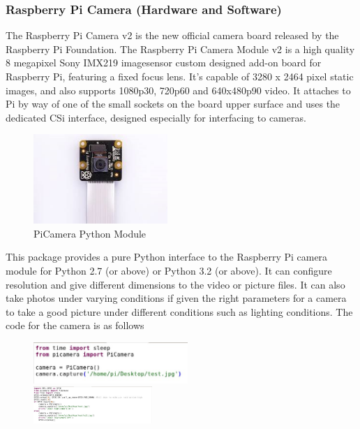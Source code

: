 \subsubsection{Raspberry Pi Camera (Hardware and Software)}
\par The Raspberry Pi Camera v2 is the new official camera board released by the Raspberry Pi Foundation. The Raspberry Pi Camera Module v2 is a high quality 8 megapixel Sony IMX219 imagesensor custom designed add-on board for Raspberry Pi, featuring a fixed focus lens. It's capable of 3280 x 2464 pixel static images, and also supports 1080p30, 720p60 and 640x480p90 video. It attaches to Pi by way of one of the small sockets on the board upper surface and uses the dedicated CSi interface, designed especially for interfacing to cameras.
\begin{figure}[h]
	\centering
	\includegraphics[width=2in]{picam.jpg}
	\caption{PiCamera Python Module}
\end{figure}
\par This package provides a pure Python interface to the Raspberry Pi camera module for Python 2.7 (or above) or Python 3.2 (or above). It can configure resolution and give different dimensions to the video or picture files. It can also take photos under varying conditions if given the right parameters for a camera to take a good picture under different conditions such as lighting conditions. 
The code for the camera is as follows
\begin{figure}[h]
	\includegraphics[width=2.3in]{camcode1.jpg}\\
	\includegraphics[width=0.4\textwidth]{camcode2.jpg}
\end{figure}

